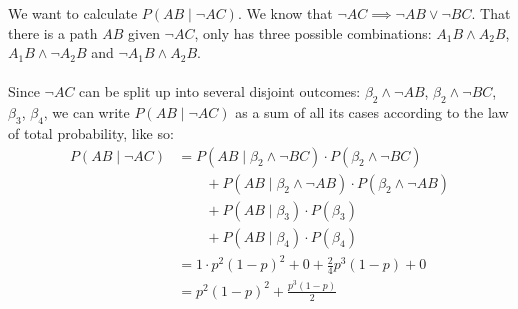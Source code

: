 \documentclass{article}
\begin{document}
We want to calculate $P(AB \mid \neg AC)$.
We know that $\neg AC \implies \neg AB \lor \neg BC$.
That there is a path $AB$ given $\neg AC$, only has three possible combinations: $A_1B \land A_2B$, $A_1B \land \neg A_2B$ and $\neg A_1B \land A_2B$.
\\
\\
% 
Since $\neg AC$ can be split up into several disjoint outcomes: $\beta_2 \land \neg AB$, $\beta_2 \land \neg BC$, $\beta_3$, $\beta_4$, we can write $P(AB \mid \neg AC)$ as a sum of all its cases according to the law of total probability, like so:
\begin{align*}
P(AB \mid \neg AC) &= P( AB \mid \beta _2 \land \neg BC) \cdot P(\beta _2 \land \neg BC) \\
&\qquad+ P(AB \mid \beta_2 \land \neg AB) \cdot P(\beta _2 \land \neg AB) \\
&\qquad+ P(AB \mid \beta_3) \cdot P(\beta _3) \\
&\qquad+ P(AB \mid \beta_4) \cdot P(\beta _4) \\
&= 1 \cdot p^2(1-p)^2 + 0 + \frac{2}{4}p^3(1-p)+0 \\
&=p^2(1-p)^2+\frac{p^3(1-p)}{2}
\end{align*}
\end{document}
